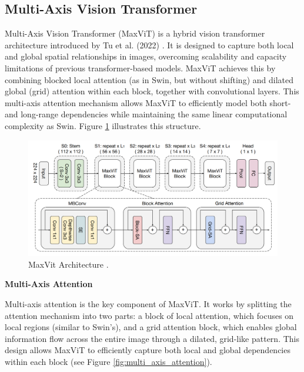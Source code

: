 \documentclass[a4paper,10pt]{book}
\begin{document}
\subsection{Multi-Axis Vision Transformer}

Multi-Axis Vision Transformer (MaxViT) is a hybrid vision transformer architecture introduced by Tu et al. (2022) \cite{tu_maxvit_2022}. It is designed to capture both local and global spatial relationships in images, overcoming scalability and capacity limitations of previous transformer-based models. MaxViT achieves this by combining blocked local attention (as in Swin, but without shifting) and dilated global (grid) attention within each block, together with convolutional layers. This multi-axis attention mechanism allows MaxViT to efficiently model both short- and long-range dependencies while maintaining the same linear computational complexity as Swin. Figure \ref{fig:max_vit_arch} illustrates this structure.

\begin{figure}[h!]
    \centering
    \includegraphics[width=1.0\linewidth]{reports//assets/maxvit_arch.png}
    \caption[Multi-Axis Vision Transformer Arch]{MaxVit Architecture \cite{tu_maxvit_2022}.}
    \label{fig:max_vit_arch}
\end{figure}


\textbf{Multi-Axis Attention}

Multi-axis attention is the key component of MaxViT. It works by splitting the attention mechanism into two parts: a block of local attention, which focuses on local regions (similar to Swin’s), and a grid attention block, which enables global information flow across the entire image through a dilated, grid-like pattern. This design allows MaxViT to efficiently capture both local and global dependencies within each block (see Figure \ref{fig:multi_axis_attention}).
\end{document}
